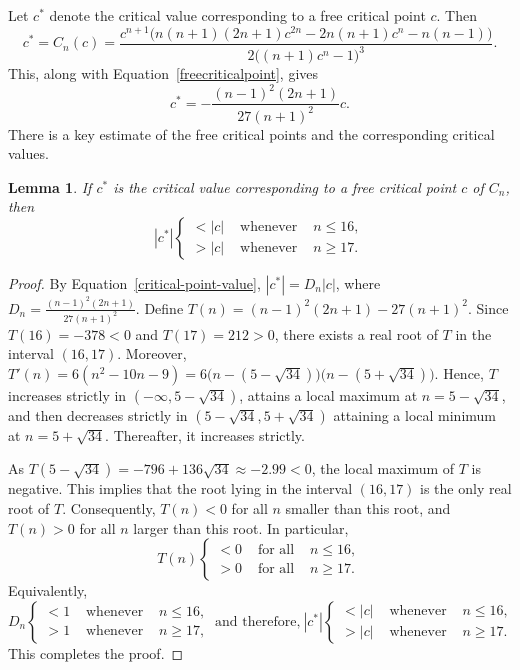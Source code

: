\documentclass[12pt]{article}
\newtheorem{lem}{Lemma}[section]
\begin{document}
 Let $c^*$ denote the critical value corresponding to a free critical point $c$. Then
 	$$c^*=C_n (c) =\frac{ c^{n+1}\big(n(n+1)(2n+1)c^{2n}-2n(n+1)c^n-n(n-1)\big)}{2\big((n+1)c^n-1\big)^3}.$$
	This, along with Equation~\eqref{freecriticalpoint}, gives
\begin{equation}
	 c^* =-\frac{(n-1)^2(2n+1)}{27(n+1)^2}c.
	 \label{critical-point-value}
\end{equation} 
There is a key estimate of the free critical points and the corresponding critical values.	
\begin{lem}\label{c_and_c^*}
		If	$c^*$ is the critical value corresponding to a free critical point $c$ of $C_n$, then
		$$|c^*| \left\{\begin{array}{ccc}
			<|c| & \text { whenever } & n \leq 16, \\
			>|c| & \text { whenever } & n \geq 17.
		\end{array}\right.
		$$
	
\end{lem}
	\begin{proof}
		By Equation~\eqref{critical-point-value}, $|c^*|=D_n |c|$, where $D_n=\frac{(n-1)^2(2n+1)}{27(n+1)^2}$. Define $T(n) =(n-1)^2(2n+1)-27(n+1)^2 $. Since  $T(16)=-378<0$ and $T(17)=212>0$, there exists a real root of $T$ in the interval $(16,17)$.
		Moreover, $T'(n)=6(n^2-10n-9)=6\big(n-(5-\sqrt{34})\big)\big(n-(5+\sqrt{34})\big)$.
		Hence, $T$ increases strictly in $(-\infty,5-\sqrt{34})$, attains a local maximum at $n=5-\sqrt{34}$, and then decreases strictly in $(5-\sqrt{34},5+\sqrt{34})$  attaining a local minimum at $n=5+\sqrt{34}$. Thereafter, it increases strictly. 
		
		As $T(5-\sqrt{34})=-796 + 136\sqrt{34} \approx -2.99 <0$, the local maximum of $T$ is negative. This implies that the root lying in the interval $(16,17)$ is the only real root of $T$. Consequently, $T(n)<0$ for all $n$ smaller than this root, and $T(n)>0$ for all $n$ larger than this root.
		In particular,
		$$
		T(n) \left\{\begin{array}{ccc}
			<0 & \text { for all } & n \leq 16, \\
			>0 & \text { for all } & n\geq 17.
		\end{array}\right.
		$$
		Equivalently,
		$$
		D_n \left\{\begin{array}{ccc}
			<1 & \text { whenever } & n \leq 16, \\
			>1 & \text { whenever } & n\geq 17,
		\end{array}\right.
	~\mbox{and therefore,}~
		|c^*| \left\{\begin{array}{ccc}
			<|c| & \text { whenever } & n \leq 16, \\
			>|c| & \text { whenever } & n\geq 17.
		\end{array}\right.
		$$
		This completes the proof.
	\end{proof}
\end{document}
